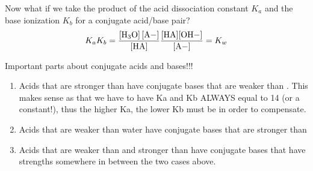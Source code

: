 \documentclass[../CHEM152Notes.tex]{subfiles}
\begin{document}
Now what if we take the product of the acid dissociation constant $K_a$ and the base ionization $K_b$ for a conjugate acid/base pair?
\begin{equation*}
    \begin{aligned}
        K_a K_b = \ce{\frac{[H3O] [A-]}{[HA]}} \ce{\frac{[HA][OH-]}{[A-]}} = K_w
    \end{aligned}
\end{equation*}

Important parts about conjugate acids and bases!!!
\begin{enumerate}
    \item Acids that are stronger than  have conjugate bases that are weaker than . This makes sense as that we have to have Ka and Kb ALWAYS equal to 14 (or a constant!), thus the higher Ka, the lower Kb must be in order to compensate.
    \item Acids that are weaker than water have conjugate bases that are stronger than 
    \item Acids that are weaker than  and stronger than  have conjugate bases that have strengths somewhere in between the two cases above.
\end{enumerate}
\end{document}
